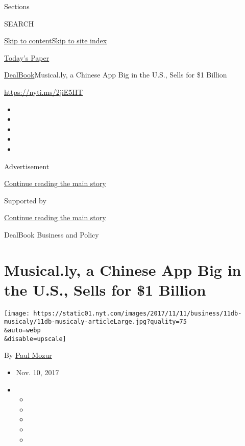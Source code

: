 Sections

SEARCH

\protect\hyperlink{site-content}{Skip to
content}\protect\hyperlink{site-index}{Skip to site index}

\href{https://myaccount.nytimes.com/auth/login?response_type=cookie\&client_id=vi}{}

\href{https://www.nytimes.com/section/todayspaper}{Today's Paper}

\href{/section/business/dealbook}{DealBook}\textbar{}Musical.ly, a
Chinese App Big in the U.S., Sells for \$1 Billion

\url{https://nyti.ms/2jiE5HT}

\begin{itemize}
\item
\item
\item
\item
\item
\end{itemize}

Advertisement

\protect\hyperlink{after-top}{Continue reading the main story}

Supported by

\protect\hyperlink{after-sponsor}{Continue reading the main story}

DealBook Business and Policy

\hypertarget{musically-a-chinese-app-big-in-the-us-sells-for-1-billion}{%
\section{Musical.ly, a Chinese App Big in the U.S., Sells for \$1
Billion}\label{musically-a-chinese-app-big-in-the-us-sells-for-1-billion}}

\texttt{[image: https://static01.nyt.com/images/2017/11/11/business/11db-musicaly/11db-musicaly-articleLarge.jpg?quality=75\\\&auto=webp\\\&disable=upscale]}

By \href{https://www.nytimes.com/by/paul-mozur}{Paul Mozur}

\begin{itemize}
\item
  Nov. 10, 2017
\item
  \begin{itemize}
  \item
  \item
  \item
  \item
  \item
  \end{itemize}
\end{itemize}

